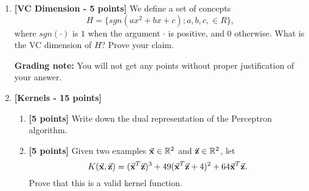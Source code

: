 \begin{enumerate}
\begin{enumerate}
\item \textbf{[15 points]} Given parameters $\delta$ and $\epsilon$, find value for $m$ such that the probability of drawing a sample of size at least $m$ that has true error larger than $\epsilon$ is less than $\delta$. 
\begin{itemize} \item \textbf{Hint}: The following inequality might be useful: \[ 1-x \leq e^{-x} \]
 \end{itemize}

\item \textbf{[5 points]} We could have found a bound on $m$ using another method. 
Derive this bound; how does it compare to the bound we found in the last step? 
(\textbf{Hint}: what is the VC Dimension of $\mathcal{H}_{2cc}$?).
  
\end{enumerate}

\item \textbf{[VC Dimension - 5 points]}
We define a set of concepts
$$H = \{sgn(ax^2 +bx+c); a, b, c,\in R\},$$
where $sgn(\cdot)$ is $1$ when the argument $\cdot$ is positive, 
and $0$ otherwise.
\noindent
What is the VC dimension of $H$? Prove your claim.

{\bf Grading note:} You will not get any points without proper justification of your answer.

\item \textbf{[Kernels - 15 points]}
  \begin{enumerate}
  \item {\bf [5 points]} Write down the dual representation of the
    Perceptron algorithm.

  \item {\bf [5 points]} Given two examples $\vec{{\bf x}} \in \mathbb{R}^2$ and
    $\vec{{\bf z}} \in \mathbb{R}^2$, let
    \begin{equation*}
      K(\vec{{\bf x}},\vec{{\bf z}}) = (\vec{{\bf x}}^T\vec{{\bf z}})^3 
                                      + 49(\vec{{\bf x}}^T\vec{{\bf z}} + 4)^2 
                                      + 64 \vec{{\bf x}}^T\vec{{\bf z}}.
    \end{equation*}
    Prove that this is a valid kernel function.
\end{enumerate}

 \begin{enumerate}


\end{enumerate}
\end{enumerate}
